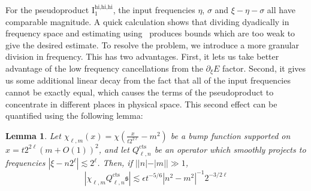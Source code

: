 \documentclass[letterpaper, reqno,final]{amsart}
\newcommand{\fs}{\mathfrak{s}}
\newcommand{\rmI}{\mathrm{I}}
\newcommand{\tcts}{\text{cts}}
\newtheorem{lemma}[thm]{Lemma}
\begin{document}
For the pseudoproduct $\rmI_1^{\text{hi,hi,hi}}$, the input frequencies $\eta$, $\sigma$ and $\xi - \eta - \sigma$ all have comparable magnitude.  A quick calculation shows that dividing dyadically in frequency space and estimating using~ produces bounds which are too weak to give the desired estimate.  To resolve the problem, we introduce a more granular division in frequency.  This has two advantages. First, it lets us take better advantage of the low frequency cancellations from the $\partial_\xi E$ factor.  Second, it gives us some additional linear decay from the fact that all of the input frequencies cannot be exactly equal, which causes the terms of the pseudoproduct to concentrate in different places in physical space.  This second effect can be quantified using the following lemma:
\begin{lemma}\label{lem:fs-loc-est}
    Let $\chi_{\ell,m}(x) = \chi \left(\frac{x}{t2^{2\ell}} - m^2\right)$ be a bump function supported on $x =  t2^{2\ell}(m + O(1))^2$, and let $Q_{\ell,n}^\tcts$ be an operator which smoothly projects to frequencies $|\xi - n 2^\ell| \lesssim 2^\ell$.  Then, if $||n| - |m|| \gg 1$, 
    \begin{equation*}
        |\chi_{\ell,m} Q_{\ell,n}^\tcts \fs| \lesssim \epsilon t^{-5/6} |n^2 - m^2|^{-1} 2^{-3/2 \ell}
    \end{equation*}
\end{lemma}
\end{document}
